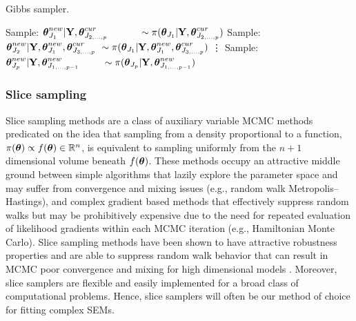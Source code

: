 \begin{algorithm}[htbp]
	\caption{Gibbs sampler.}
	\label{alg:gibbs}
	\begin{algorithmic}[1]
			\State Sample: $ \boldsymbol{\theta}^{new}_{J_1}|\mathbf{Y},\boldsymbol{\theta}^{cur}_{J_{2,\dots,p}}\hspace{0.45in} \sim\pi(\boldsymbol{\theta}_{J_1}|\mathbf{Y},\boldsymbol{\theta}^{cur}_{J_{2,\dots,p}}) $
			\State Sample: $ \btheta^{new}_{J_2}|\bY,\btheta^{new}_{J_1},\btheta^{cur}_{J_{3,\dots,p}}\ \sim\pi(\btheta_{J_1}|\bY,\btheta^{new}_{J_1},\btheta^{cur}_{J_{3,\dots,p}}) $
			\State \hspace{0.2in} \vdots
			\State Sample: $ \boldsymbol{\theta}^{new}_{J_p}|\mathbf{Y},\boldsymbol{\theta}_{J_{1,\dots,p-1}}^{new} \hspace{0.33in} \sim \pi(\boldsymbol{\theta}_{J_p}|\mathbf{Y},\boldsymbol{\theta}_{J_{1,\dots,p-1}}^{new}) $
		\EndFor
		\EndProcedure
	\end{algorithmic}
\end{algorithm}

\subsubsection{Slice sampling}
\label{subsubsec:slice_sampling}

Slice sampling methods are a class of auxiliary variable MCMC methods predicated on the idea that sampling from a density proportional to a function, $ \pi(\boldsymbol{\theta})\propto f(\boldsymbol{\theta}) \in \mathbb{R}^n $, is equivalent to sampling uniformly from the $ n+1 $ dimensional volume beneath $ f(\boldsymbol{\theta}) $. These methods occupy an attractive middle ground between simple algorithms that lazily explore the parameter space and may suffer from convergence and mixing issues (e.g., random walk Metropolis--Hastings), and complex gradient based methods that effectively suppress random walks but may be prohibitively expensive due to the need for repeated evaluation of likelihood gradients within each MCMC iteration (e.g., Hamiltonian Monte Carlo). Slice sampling methods have been shown to have attractive robustness properties and are able to suppress random walk behavior that can result in MCMC poor convergence and mixing for high dimensional models \cite{mira2002efficiency,roberts1999convergence,neal2003slice}. Moreover, slice samplers are flexible and easily implemented for a broad class of computational problems. Hence, slice samplers will often be our method of choice for fitting complex SEMs. 

